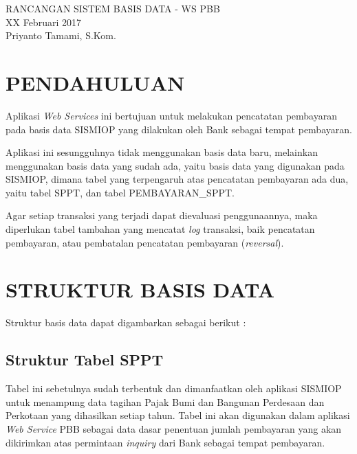 \documentclass[pdftex,12pt, oneside]{article}
\begin{document}
\sloppy %

\begin{center}
{\large RANCANGAN SISTEM BASIS DATA - WS PBB}
\\[1cm]
XX Februari 2017\\
Priyanto Tamami, S.Kom.
\end{center}




\section{PENDAHULUAN}

Aplikasi \textit{Web Services} ini bertujuan untuk melakukan pencatatan pembayaran pada basis data SISMIOP yang dilakukan oleh Bank sebagai tempat pembayaran.

Aplikasi ini sesungguhnya tidak menggunakan basis data baru, melainkan menggunakan basis data yang sudah ada, yaitu basis data yang digunakan pada SISMIOP, dimana tabel yang terpengaruh atas pencatatan pembayaran ada dua, yaitu tabel SPPT, dan tabel PEMBAYARAN\_SPPT.

Agar setiap transaksi yang terjadi dapat dievaluasi penggunaannya, maka diperlukan tabel tambahan yang mencatat \textit{log} transaksi, baik pencatatan pembayaran, atau pembatalan pencatatan pembayaran (\textit{reversal}).


\section{STRUKTUR BASIS DATA}

Struktur basis data dapat digambarkan sebagai berikut :

\subsection{Struktur Tabel SPPT}

Tabel ini sebetulnya sudah terbentuk dan dimanfaatkan oleh aplikasi SISMIOP untuk menampung data tagihan Pajak Bumi dan Bangunan Perdesaan dan Perkotaan yang dihasilkan setiap tahun. Tabel ini akan digunakan dalam aplikasi \textit{Web Service} PBB sebagai data dasar penentuan jumlah pembayaran yang akan dikirimkan atas permintaan \textit{inquiry} dari Bank sebagai tempat pembayaran.
\end{document}
